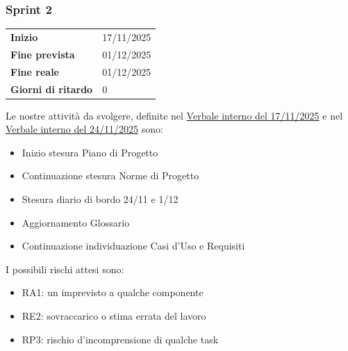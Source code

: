 \subsubsection{Sprint 2}


\begin{tabular}{p{} p{}}
	\textbf{Inizio} & 17/11/2025 \\
	\textbf{Fine prevista} & 01/12/2025 \\
	\textbf{Fine reale} & 01/12/2025 \\
	\textbf{Giorni di ritardo} & 0
\end{tabular}
\newline \newline 
Le nostre attività da svolgere, definite nel \href{https://nullpointersgroup.github.io/Documentazione/output/RTB/Verbali%20Interni/2025-11-17_verbale_interno.pdf}{Verbale interno del 17/11/2025} e nel \href{https://nullpointersgroup.github.io/Documentazione/output/RTB/Verbali%20Interni/2025-11-24_verbale_interno.pdf}{Verbale interno del 24/11/2025} sono:
\begin{itemize}[itemsep=5pt, parsep=1pt, label=$\scriptstyle\bullet$]
	\item Inizio stesura Piano di Progetto
	\item Continuazione stesura Norme di Progetto
	\item Stesura diario di bordo 24/11 e 1/12
	\item Aggiornamento Glossario
	\item Continuazione individuazione Casi d'Uso e Requisiti
\end{itemize}


I possibili rischi attesi sono:
\begin{itemize}[itemsep=5pt, parsep=1pt, label=$\scriptstyle\bullet$]
	\item RA1: un imprevisto a qualche componente
	\item RE2: sovraccarico o stima errata del lavoro
	\item RP3: rischio d'incomprensione di qualche task
\end{itemize}


